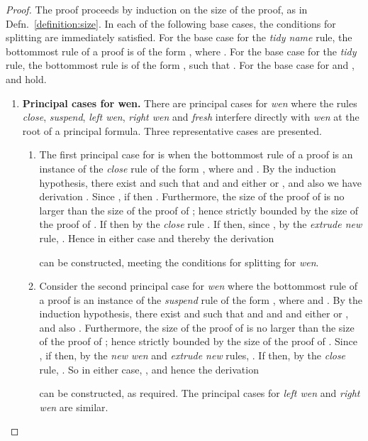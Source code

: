 \begin{proof}
The proof proceeds by induction on the size of the proof, as in Defn.~\ref{definition:size}. 
In each of the following base cases, the conditions for splitting are immediately satisfied.
For the base case for the \textit{tidy name} rule, the bottommost rule of a proof is of the form 
, where .
For the base case for the \textit{tidy} rule, the bottommost rule is of the form 
, such that .
For the base case for  and ,  and  hold.

\begin{enumerate}[label=\textbf{\Alph*},ref=\Alph*,leftmargin=*]
\item \textbf{Principal cases for wen.}
There are principal cases for \textit{wen} where the rules \textit{close}, \textit{suspend}, \textit{left wen}, \textit{right wen} and \textit{fresh} interfere directly with \textit{wen} at the root of a principal formula. Three representative cases are presented.

\begin{enumerate}[label*=\textbf{.\arabic*}]
\item The first principal case for  is when the bottommost rule of a proof is an instance of the \textit{close} rule of the form 
,
where  and .
By the induction hypothesis,
there exist  and  such that  and  and either  or , and also we have derivation .
Since , if  then .
Furthermore, the size of the proof of  is no larger than the size of the proof of ; hence strictly bounded by the size of the proof of .
If  then by the \textit{close} rule .
If  then, since , by the \textit{extrude new} rule,
.
Hence in either case 
and thereby the derivation 

can be constructed,
meeting the conditions for splitting for \textit{wen}.


\item Consider the second principal case for \textit{wen} where the bottommost rule of a proof is an instance of the \textit{suspend} rule of the form
, where  and .
By the induction hypothesis,
there exist  and  such that and  and  and either  or , and also .
Furthermore, the size of the proof of  is no larger than the size of the proof of ; hence strictly bounded by the size of the proof of .
Since , if  then, by the \textit{new wen} and \textit{extrude new} rules, 
.
If  then, by the \textit{close} rule, .
So in either case, ,
and hence the derivation

can be constructed, as required.
The principal cases for \textit{left wen} and \textit{right wen} are similar.



\end{enumerate}
\end{enumerate}
\end{proof}
